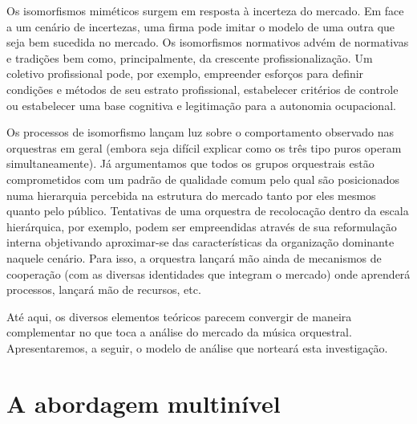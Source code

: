 \documentclass[a4paper, 12pt, openright, oneside, german, french, english, brazil]{abntex2}
\begin{document}
	Os isomorfismos miméticos surgem em resposta à incerteza do mercado. Em face a um cenário de incertezas, uma firma pode imitar o modelo de uma outra que seja bem sucedida no mercado. Os isomorfismos normativos advém de normativas e tradições bem como, principalmente, da crescente profissionalização. Um coletivo profissional pode, por exemplo, empreender esforços para definir condições e métodos de seu estrato profissional, estabelecer critérios de controle ou estabelecer uma base cognitiva e legitimação para a autonomia ocupacional.

	Os processos de isomorfismo lançam luz sobre o comportamento observado nas orquestras em geral (embora seja difícil explicar como os três tipo puros operam simultaneamente). Já argumentamos que todos os grupos orquestrais estão comprometidos com um padrão de qualidade comum pelo qual são posicionados numa hierarquia percebida na estrutura do mercado tanto por eles mesmos quanto pelo público. Tentativas de uma orquestra de recolocação dentro da escala hierárquica, por exemplo, podem ser empreendidas através de sua reformulação interna objetivando aproximar-se das características da organização dominante naquele cenário. Para isso, a orquestra lançará mão ainda de mecanismos de cooperação (com as diversas identidades que integram o mercado) onde aprenderá processos, lançará mão de recursos, etc.

	Até aqui, os diversos elementos teóricos parecem convergir de maneira complementar no que toca a análise do mercado da música orquestral. Apresentaremos, a seguir, o modelo de análise que norteará esta investigação.




	\section{A abordagem multinível}\label{cap:multinivel}
	
\end{document}
